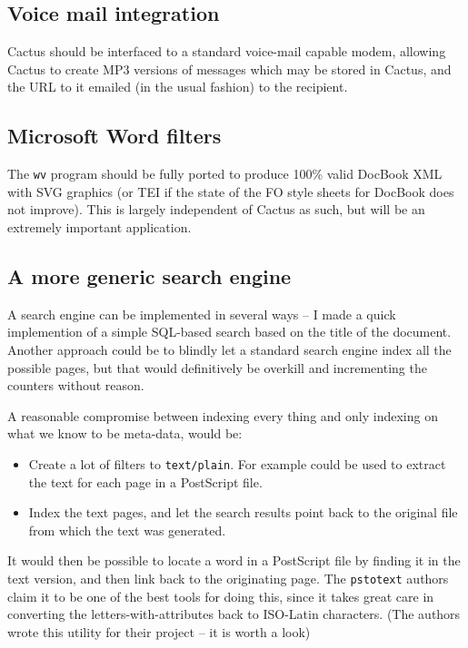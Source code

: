 \subsection*{Voice mail integration}

Cactus should be interfaced to a standard voice-mail capable modem,
allowing Cactus to create MP3 versions of messages which may be stored
in Cactus, and the URL to it emailed (in the usual fashion) to the
recipient.


\subsection*{Microsoft Word filters}

The \texttt{wv} program should be fully ported to produce 100\% valid
DocBook XML with SVG graphics (or TEI if the state of the FO style
sheets for DocBook does not improve).  This is largely independent of
Cactus as such, but will be an extremely important application.


\subsection*{A more generic search engine}

A search engine can be implemented in several ways -- I made a quick
implemention of a simple SQL-based search based on the title of the
document.  Another approach could be to blindly let a standard search
engine index all the possible pages, but that would definitively be
overkill and incrementing the counters without reason.

A reasonable compromise between indexing every thing and only indexing
on what we know to be meta-data, would be:

\begin{itemize}
\item Create a lot of filters to \texttt{text/plain}.  For example
  could
  be used to extract the text for each page in a PostScript file.

\item
  Index the text pages, and let the search results point back to the
  original file from which the text was generated.
\end{itemize}

It would then be possible to locate a word in a PostScript file by
finding it in the text version, and then link back to the originating
page.  The \texttt{pstotext} authors claim it to be one of the best
tools for doing this, since it takes great care in converting the
letters-with-attributes back to ISO-Latin characters.  (The authors
wrote this utility for their
 project -- it is worth a look)


